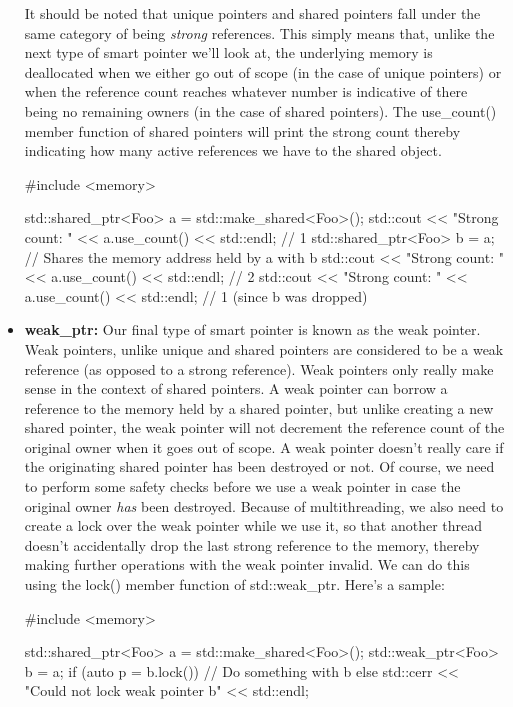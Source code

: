 \documentclass{article}
\begin{document}
\begin{itemize}
{    It should be noted that unique pointers and shared pointers fall under the same category of being
    \textit{strong} references. This simply means that, unlike the next type of smart pointer we'll look at,
    the underlying memory is deallocated when we either go out of scope (in the case of unique pointers) or
    when the reference count reaches whatever number is indicative of there being no remaining owners (in the
    case of shared pointers). The use\_count() member function of shared pointers will print the strong count
    thereby indicating how many active references we have to the shared object.

    \begin{cpplst}
    #include <memory>

    std::shared_ptr<Foo> a = std::make_shared<Foo>();
    std::cout << "Strong count: " << a.use_count() << std::endl; // 1
    {
        std::shared_ptr<Foo> b = a; // Shares the memory address held by a with b
        std::cout << "Strong count: " << a.use_count() << std::endl; // 2
    }
    std::cout << "Strong count: " << a.use_count() << std::endl; // 1 (since b was dropped)
    \end{cpplst}
}

\item{%
    \textbf{weak\_ptr:} Our final type of smart pointer is known as the weak pointer. Weak pointers, unlike
    unique and shared pointers are considered to be a weak reference (as opposed to a strong reference). Weak
    pointers only really make sense in the context of shared pointers. A weak pointer can borrow a reference
    to the memory held by a shared pointer, but unlike creating a new shared pointer, the weak pointer will
    not decrement the reference count of the original owner when it goes out of scope. A weak pointer doesn't
    really care if the originating shared pointer has been destroyed or not. Of course, we need to perform
    some safety checks before we use a weak pointer in case the original owner \textit{has} been destroyed.
    Because of multithreading, we also need to create a lock over the weak pointer while we use it, so that
    another thread doesn't accidentally drop the last strong reference to the memory, thereby making further
    operations with the weak pointer invalid. We can do this using the lock() member function of
    std::weak\_ptr. Here's a sample:

    \begin{cpplst}
    #include <memory>

    std::shared_ptr<Foo> a = std::make_shared<Foo>();
    {
        std::weak_ptr<Foo> b = a;
        if (auto p = b.lock())
        {
            // Do something with b
        }
        else
        {
            std::cerr << "Could not lock weak pointer b" << std::endl;
        }
    }
    \end{cpplst}
}

\end{itemize}
\end{document}
